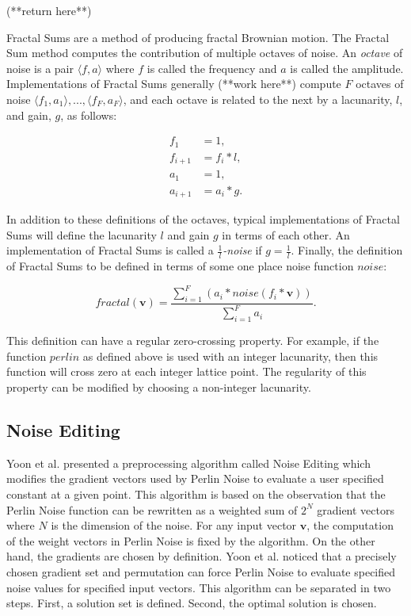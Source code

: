 \documentclass[12pt]{article}
\theoremstyle{definition}
\theoremstyle{remark}
\begin{document}
(**return here**)

Fractal Sums are a method of producing fractal Brownian motion\cite{lagaeetal2010}. The Fractal Sum method computes the contribution of multiple octaves of noise. An \textit{octave} of noise is a pair $\langle f, a \rangle$ where $f$ is called the frequency and $a$ is called the amplitude. Implementations of Fractal Sums generally (**work here**) compute $F$ octaves of noise $\langle f_1, a_1 \rangle, ..., \langle f_F, a_F \rangle$, and each octave is related to the next by a lacunarity, $l$, and gain, $g$, as follows:

\begin{align*}
	f_1 &= 1, \\
	f_{i+1} &= f_i * l, \\
	a_1 &= 1, \\
	a_{i+1} &= a_i * g.
\end{align*}

In addition to these definitions of the octaves, typical implementations of Fractal Sums will define the lacunarity $l$ and gain $g$ in terms of each other. An implementation of Fractal Sums is called a $\frac{1}{l}$\textit{-noise} if $g=\frac{1}{l}$. Finally, the definition of Fractal Sums to be defined in terms of some one place noise function $noise$:

\begin{equation*}
	fractal(\textbf{v}) = \frac{\sum_{i=1}^{F}(a_i * noise(f_i * \textbf{v}))}{\sum_{i=1}^{F}a_i}.
\end{equation*}

This definition can have a regular zero-crossing property. For example, if the function $perlin$ as defined above is used with an integer lacunarity, then this function will cross zero at each integer lattice point. The regularity of this property can be modified by choosing a non-integer lacunarity.

\subsection{Noise Editing}

Yoon et al.\cite{yoonetal2004} presented a preprocessing algorithm called Noise Editing which modifies the gradient vectors used by Perlin Noise to evaluate a user specified constant at a given point. This algorithm is based on the observation that the Perlin Noise function can be rewritten as a weighted sum of $2^N$ gradient vectors where $N$ is the dimension of the noise. For any input vector $\textbf{v}$, the computation of the weight vectors in Perlin Noise is fixed by the algorithm. On the other hand, the gradients are chosen by definition. Yoon et al. noticed that a precisely chosen gradient set and permutation can force Perlin Noise to evaluate specified noise values for specified input vectors. This algorithm can be separated in two steps. First, a solution set is defined. Second, the optimal solution is chosen.
\end{document}
